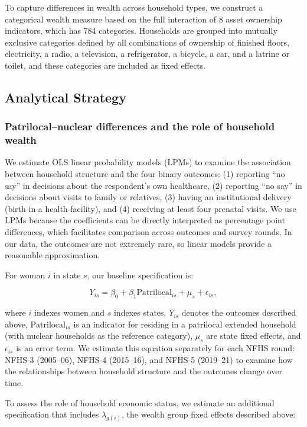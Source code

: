 \documentclass[12pt]{article}
\begin{document}
To capture differences in wealth across household types, we construct a categorical wealth measure based on the full interaction of 8 asset ownership indicators, which has 784 categories. Households are grouped into mutually exclusive categories defined by all combinations of ownership of finished floors, electricity, a radio, a television, a refrigerator, a bicycle, a car, and a latrine or toilet, and these categories are included as fixed effects.


\subsection{Analytical Strategy}
\subsubsection{Patrilocal–nuclear differences and the role of household wealth}

We estimate OLS linear probability models (LPMs) to examine the association between household structure and the four binary outcomes: (1) reporting ``no say'' in decisions about the respondent's own healthcare, (2) reporting ``no say'' in decisions about visits to family or relatives, (3) having an institutional delivery (birth in a health facility), and (4) receiving at least four prenatal visits. We use LPMs because the coefficients can be directly interpreted as percentage point differences, which facilitates comparison across outcomes and survey rounds. In our data, the outcomes are not extremely rare, so linear models provide a reasonable approximation.

For woman $i$ in state $s$, our baseline specification is:

\begin{equation} \label{eq:nocontrols}
Y_{is} = \beta_0 + \beta_1 \text{Patrilocal}_{is} + \mu_s + \epsilon_{is},
\end{equation}

where $i$ indexes women and $s$ indexes states. $Y_{is}$ denotes the outcomes described above, $\text{Patrilocal}_{is}$ is an indicator for residing in a patrilocal extended household (with nuclear households as the reference category), $\mu_s$ are state fixed effects, and $\epsilon_{is}$ is an error term. We estimate this equation separately for each NFHS round: NFHS-3 (2005--06), NFHS-4 (2015--16), and NFHS-5 (2019--21) to examine how the relationships between household structure and the outcomes change over time.

To assess the role of household economic status, we estimate an additional specification that includes $\lambda_{g(i)}$, the wealth group fixed effects described above:
\end{document}
